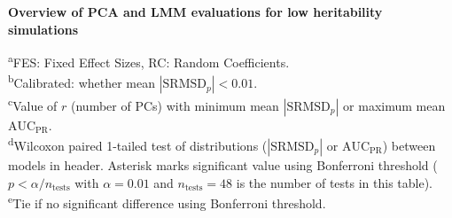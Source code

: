 \documentclass[11pt]{article}
\newcommand{\rmsd}{\text{SRMSD}_p}
\newcommand{\auc}{\text{AUC}_\text{PR}}
\begin{document}
\begin{table}[b!]
  \centering
  \scriptsize
  \caption{
    \textbf{Overview of PCA and LMM evaluations for low heritability simulations}
  }
  \label{tab:human_sum_pcs_h3}
  \begin{flushleft}
    \textsuperscript{a}FES: Fixed Effect Sizes, RC: Random Coefficients.\\
    \textsuperscript{b}Calibrated: whether mean $|\rmsd| < 0.01$.\\
    \textsuperscript{c}Value of $r$ (number of PCs) with minimum mean $|\rmsd|$ or maximum mean $\auc$.\\
    \textsuperscript{d}Wilcoxon paired 1-tailed test of distributions ($|\rmsd|$ or $\auc$) between models in header.
    Asterisk marks significant value using Bonferroni threshold ($p < \alpha/n_\text{tests}$ with $\alpha = 0.01$ and $n_\text{tests} = 48$ is the number of tests in this table).\\
    \textsuperscript{e}Tie if no significant difference using Bonferroni threshold.
  \end{flushleft}
\end{table}
\end{document}
